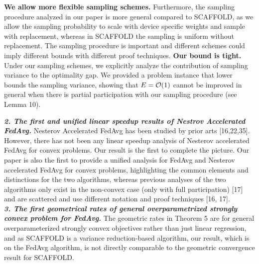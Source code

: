 \documentclass{article}
\begin{document}
	\textbf{We allow more flexible sampling schemes.} Furthermore, the sampling procedure analyzed in our paper is more general compared to SCAFFOLD, as we allow the sampling probability to scale with device specific weights and sample with replacement, whereas in SCAFFOLD the sampling is uniform without replacement. The sampling procedure is important and different schemes could imply different bounds with different proof techniques.
	\textbf{Our bound is tight.} Under our sampling schemes, we explicitly analyze the contribution of sampling variance to the optimality gap. We provided a problem instance that lower bounds the sampling variance, showing that $E={\mathcal{O}}(1)$ cannot be improved in general when there is partial participation with our sampling procedure (see Lemma 10).
\vspace{-1.5mm}

\textbf{\textit{2. The first and unified linear speedup results of Nestrov Accelerated FedAvg.}}
Nesterov Accelerated FedAvg has been studied by prior arts [16,22,35]. However, there has not been any linear speedup analysis of Nesterov accelerated FedAvg for convex problems. Our result is the first to complete the picture. Our paper is also the first to provide a unified analysis for FedAvg and Nesterov accelerated FedAvg for convex problems, highlighting the common elements and distinctions for the two algorithms, whereas previous analyses of the two algorithms only exist in the non-convex case (only with full participation) [17] and are scattered and use different notation and proof techniques [16, 17].  \\
\textbf{\textit{3. The first geometrical rates of general overparametrized strongly convex problem for FedAvg.}}
The geometric rates in Theorem 5 are for general overparameterized strongly convex objectives rather than just linear regression, and as SCAFFOLD is a variance reduction-based algorithm, our result, which is on the FedAvg algorithm, is not directly comparable to the geometric convergence result for SCAFFOLD. 


    
\end{document}
